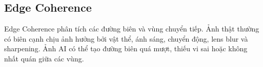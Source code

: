 \subsection{Edge Coherence}
Edge Coherence phân tích các đường biên và vùng chuyển tiếp. Ảnh thật thường có biên cạnh chịu ảnh hưởng bởi vật thể, ánh sáng, chuyển động, lens blur và sharpening. Ảnh AI có thể tạo đường biên quá mượt, thiếu vi sai hoặc không nhất quán giữa các vùng.
